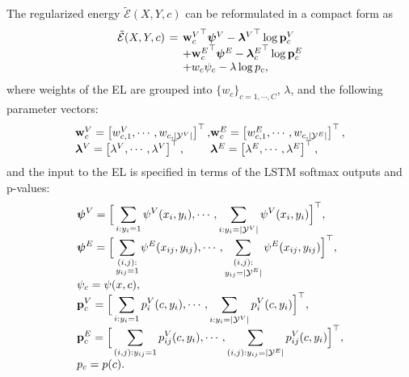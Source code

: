 \documentclass[10pt,twocolumn,letterpaper]{article}
\begin{document}
The regularized energy $\tilde{\mathcal{E}}(X,Y, c)$ can be reformulated in a compact form as%
\begin{equation}
\setlength{\arraycolsep}{2pt}
\begin{array}{lcl}
 \tilde{\mathcal{E}}(X,Y, c) &=& {\ob_c^V}^\top\psib^V - {\lb^V}^\top \log\pb_c^V \\
 &&+ {\ob_c^E}^\top\psib^E - {\lb_c^E}^\top \log\pb_c^E \\
 &&+w_c\psi_c - \lambda\log p_c,
\end{array}
\label{eq:energy_c}
\end{equation}
%
%
where weights of the EL are grouped into $\{w_c\}_{c =1,\cdots,C}$, $\lambda$, and the following parameter vectors:
\begin{equation}
\setlength{\arraycolsep}{0pt}
\begin{array}{ll}
\ob_c^V = \left[w_{c,1}^V, \cdots, w_{c,|\mathcal{Y}^V|}\right]^\top,&
\ob_c^E = \left[w_{c,1}^E, \cdots, w_{c,|\mathcal{Y}^E|}\right]^\top,\\
\lb^V = \left[\lambda^V, \cdots, \lambda^V\right]^\top,&
\lb^E = \left[\lambda^E, \cdots, \lambda^E\right]^\top,
\end{array}
\label{eq:parameters}
\end{equation}
and the input to the EL is specified in terms of the LSTM softmax outputs and p-values:
\begin{equation}
\setlength{\arraycolsep}{0pt}
\begin{array}{l}
\displaystyle
\psib^V = \Big[\sum_{i : y_i = 1} \psi^V(x_i, y_i), \cdots, \sum_{i:y_i = |\mathcal{Y}^V|} \psi^V(x_i, y_i)\Big]^\top,\\
\displaystyle
\psib^E=  \Big[\sum_{\substack{(i,j):\\y_{ij} = 1}} \psi^E(x_{ij}, y_{ij}), \cdots, \sum_{\substack{(i,j):\\y_{ij} = |\mathcal{Y}^E|}} \psi^E(x_{ij}, y_{ij})\Big]^\top,\\\displaystyle
\psi_c = \psi(x, c),\\\displaystyle
\pb_c^V = \Big[\sum_{i : y_i = 1} p_i^V(c, y_i), \cdots, \sum_{i: y_i = |\mathcal{Y}^V|} p_i^V(c, y_i)\Big]^\top,\\\displaystyle
\pb_c^E = \Big[\sum_{(i,j) : y_{ij} = 1} p_{ij}^V(c, y_i), \cdots, \sum_{(i,j): y_{ij} = |\mathcal{Y}^E|} p_{ij}^V(c, y_i)\Big]^\top,\\
p_c = p(c).
\end{array}
\end{equation}
\end{document}
